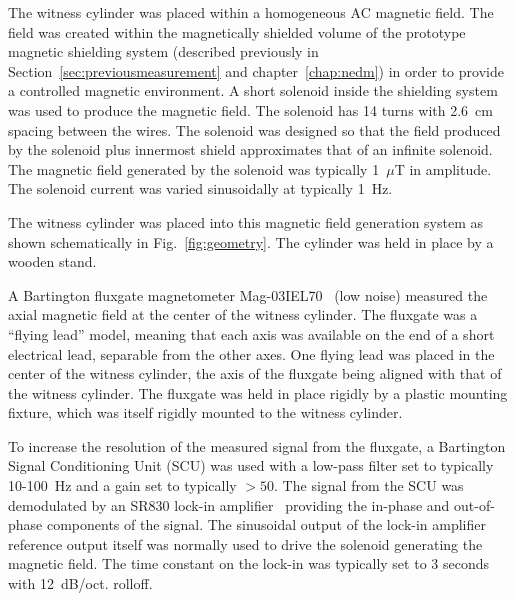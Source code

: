 The witness cylinder was placed within a homogeneous AC magnetic
field. The field was created within the magnetically shielded volume
of the prototype magnetic shielding system (described previously in
Section~\ref{sec:previousmeasurement} and chapter~\ref{chap:nedm}) in
order to provide a controlled magnetic environment.  A short solenoid
inside the shielding system was used to produce the magnetic
field. The solenoid has 14 turns with 2.6~cm spacing between the
wires.  The solenoid was designed so that the field produced by the
solenoid plus innermost shield approximates that of an infinite
solenoid.  The magnetic field generated by the solenoid was typically
1~$\mu$T in amplitude.  The solenoid current was varied sinusoidally
at typically 1~Hz.

The witness cylinder was placed into this magnetic field generation
system as shown schematically in Fig.~\ref{fig:geometry}. The
cylinder was held in place by a wooden stand.

A Bartington fluxgate magnetometer Mag-03IEL70~\cite{bartman} (low
noise) measured the axial magnetic field at the center of the witness
cylinder.  The fluxgate was a ``flying lead'' model, meaning that each
axis was available on the end of a short electrical lead, separable
from the other axes.  One flying lead was placed in the center of the
witness cylinder, the axis of the fluxgate being aligned with that of
the witness cylinder.  The fluxgate was held in place rigidly by a
plastic mounting fixture, which was itself rigidly mounted to the
witness cylinder.

To increase the resolution of the measured signal from the fluxgate, a
Bartington Signal Conditioning Unit (SCU) was used with a low-pass
filter set to typically 10-100~Hz and a gain set to typically $>50$.
The signal from the SCU was demodulated by an SR830 lock-in
amplifier~\cite{lockin} providing the in-phase and out-of-phase
components of the signal.  The sinusoidal output of the lock-in
amplifier reference output itself was normally used to drive the
solenoid generating the magnetic field.  The time constant on the
lock-in was typically set to 3 seconds with 12~dB/oct. rolloff.

